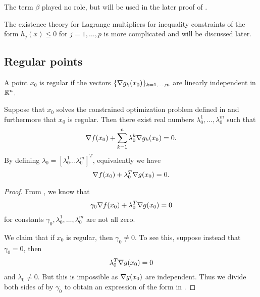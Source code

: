 \begin{remark}
The term $\beta$ played no role, but will be used in the later proof of .

The existence theory for Lagrange multipliers for inequality constraints of the form $h_j (x) \le 0$ for $j=1,\dots, p$ is more complicated and will be discussed later. 
\end{remark}

\subsection{Regular points}

\begin{definition}
A point $x_0$ is regular if the vectors $\{\nabla g_k(x_0) \} _{k=1,\dots,m}$ are linearly independent in $\mathbb{R}^n$.
\end{definition}

\begin{theorem}
Suppose that $x_0$ solves the constrained optimization problem defined in  and furthermore that $x_0$ is regular. Then there exist real numbers $\lambda_0^1,\dots,\lambda_0^m$ such that
\begin{align}
\nabla f(x_0) + \sum_{k=1}^{n} \lambda_0^k \nabla g_k(x_0) = 0.
\end{align}
By defining $\lambda_0 = [ \lambda_0^1 \dots \lambda_0^m ]^T$, equivalently we have
\begin{align}
\grad f(x_0) + \lambda_0^T \grad g(x_0) = 0. \labeq{cfvf_mat}
\end{align}
\end{theorem}
\begin{proof}
From , we know that 
\begin{align}
\gamma_0 \grad f(x_0) + \lambda_0^T \grad g(x_0) = 0 \labeq{}
\end{align}
for constants $\gamma_0, \lambda_0^1, \dots, \lambda_0^m$ are not all zero.

We claim that if $x_0$ is regular, then $\gamma_0 \neq 0$.
To see this, suppose instead that $\gamma_0 = 0$, then
\begin{align}
\lambda_0^T \nabla g(x_0) = 0
\end{align}
and $\lambda_0 \neq 0$. But this is impossible as $\nabla g(x_0)$ are independent. 
Thus we divide both sides of  by $\gamma_0$ to obtain an expression of the form in .
\end{proof}

